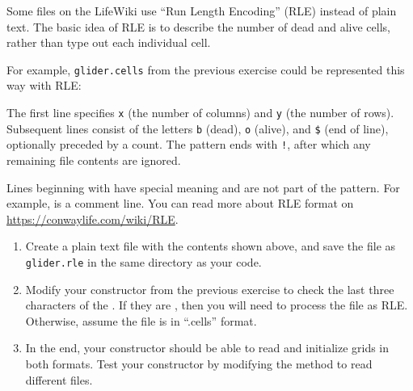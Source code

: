 \begin{exercise}
Some files on the LifeWiki use ``Run Length Encoding'' (RLE) instead of plain text.
The basic idea of RLE is to describe the number of dead and alive cells, rather than type out each individual cell.

For example, \verb|glider.cells| from the previous exercise could be represented this way with RLE:


The first line specifies \verb|x| (the number of columns) and \verb|y| (the number of rows).
Subsequent lines consist of the letters \verb|b| (dead), \verb|o| (alive), and \verb|$| (end of line), optionally preceded by a count.
The pattern ends with \verb|!|, after which any remaining file contents are ignored.

Lines beginning with \java{#} have special meaning and are not part of the pattern.
For example,  is a comment line.
You can read more about RLE format on \url{https://conwaylife.com/wiki/RLE}.

\begin{enumerate}

\item Create a plain text file with the contents shown above, and save the file as \verb|glider.rle| in the same directory as your code.


\item Modify your constructor from the previous exercise to check the last three characters of the .
If they are , then you will need to process the file as RLE.
Otherwise, assume the file is in ``.cells'' format.

\item In the end, your constructor should be able to read and initialize grids in both formats.
Test your constructor by modifying the  method to read different files.

\end{enumerate}

\end{exercise}
